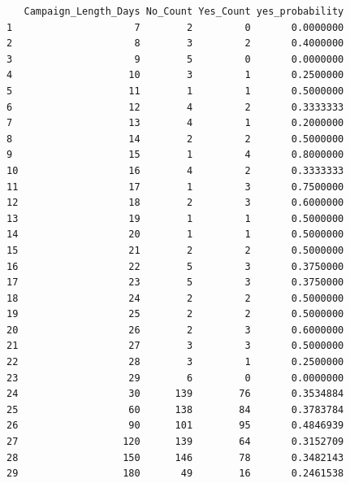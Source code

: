 \documentclass[
  letterpaper,
  DIV=11,
  numbers=noendperiod]{scrartcl}
\begin{document}
\begin{verbatim}
   Campaign_Length_Days No_Count Yes_Count yes_probability
1                     7        2         0       0.0000000
2                     8        3         2       0.4000000
3                     9        5         0       0.0000000
4                    10        3         1       0.2500000
5                    11        1         1       0.5000000
6                    12        4         2       0.3333333
7                    13        4         1       0.2000000
8                    14        2         2       0.5000000
9                    15        1         4       0.8000000
10                   16        4         2       0.3333333
11                   17        1         3       0.7500000
12                   18        2         3       0.6000000
13                   19        1         1       0.5000000
14                   20        1         1       0.5000000
15                   21        2         2       0.5000000
16                   22        5         3       0.3750000
17                   23        5         3       0.3750000
18                   24        2         2       0.5000000
19                   25        2         2       0.5000000
20                   26        2         3       0.6000000
21                   27        3         3       0.5000000
22                   28        3         1       0.2500000
23                   29        6         0       0.0000000
24                   30      139        76       0.3534884
25                   60      138        84       0.3783784
26                   90      101        95       0.4846939
27                  120      139        64       0.3152709
28                  150      146        78       0.3482143
29                  180       49        16       0.2461538
\end{verbatim}
\end{document}
